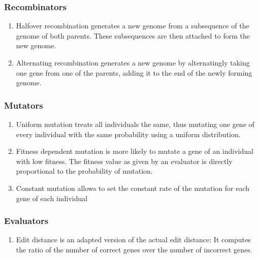 \documentclass[a4paper,10pt]{article}
\begin{document}
\subsubsection{Recombinators}
\begin{enumerate}
 \item Halfover recombination generates a new genome from a subsequence of the genome of both parents. These subsequences are then attached to form the new genome.
 \item Alternating recombination generates a new genome by alternatingly taking one gene from one of the parents, adding it to the end of the newly forming genome.
\end{enumerate}

\subsubsection{Mutators}
\begin{enumerate}
 \item Uniform mutation treats all individuals the same, thus mutating one gene of every individual with the same probability using a uniform distribution.
 \item Fitness dependent mutation is more likely to mutate a gene of an individual with low fitness. The fitness value as given by an evaluator is directly proportional to the probability of mutation.
 \item Constant mutation allows to set the constant rate of the mutation for each gene of each individual
\end{enumerate}

\subsubsection{Evaluators}
\begin{enumerate}
 \item Edit distance is an adapted version of the actual edit distance: It computes the ratio of the number of correct genes over the number of incorrect genes.
\end{enumerate}
\end{document}
